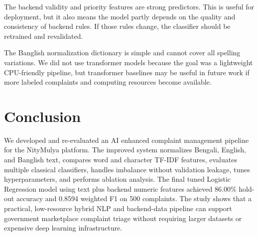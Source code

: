 \documentclass[a4paper,fleqn]{cas-dc}
\begin{document}
The backend validity and priority features are strong predictors. This is useful for deployment, but it also means the model partly depends on the quality and consistency of backend rules. If those rules change, the classifier should be retrained and revalidated.

The Banglish normalization dictionary is simple and cannot cover all spelling variations. We did not use transformer models because the goal was a lightweight CPU-friendly pipeline, but transformer baselines may be useful in future work if more labeled complaints and computing resources become available.

\section{Conclusion}

We developed and re-evaluated an AI enhanced complaint management pipeline for the NityMulya platform. The improved system normalizes Bengali, English, and Banglish text, compares word and character TF-IDF features, evaluates multiple classical classifiers, handles imbalance without validation leakage, tunes hyperparameters, and performs ablation analysis. The final tuned Logistic Regression model using text plus backend numeric features achieved 86.00\% hold-out accuracy and 0.8594 weighted F1 on 500 complaints. The study shows that a practical, low-resource hybrid NLP and backend-data pipeline can support government marketplace complaint triage without requiring larger datasets or expensive deep learning infrastructure.

\FloatBarrier
\end{document}
